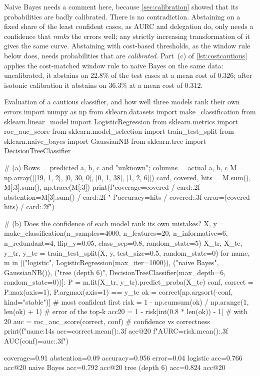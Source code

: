 Naive Bayes needs a comment here, because \cref{sec:calibration} showed that its probabilities are badly
calibrated. There is no contradiction. Abstaining on a fixed share of the least confident cases, as AURC and
delegation do, only needs a confidence that \emph{ranks} the errors well; any strictly increasing transformation of
it gives the same curve. Abstaining with cost-based thresholds, as the window rule below does, needs
probabilities that are \emph{calibrated}. Part~(c) of \cref{lst:costcautious} applies the cost-matched window rule
to naive Bayes on the same data: uncalibrated, it abstains on 22.8\% of the test cases at a mean cost of 0.326;
after isotonic calibration it abstains on 36.3\% at a mean cost of 0.312.

\begin{pylisting}[label={lst:cautious}]{Evaluation of a cautious classifier, and how well three models rank their own errors}
import numpy as np
from sklearn.datasets import make_classification
from sklearn.linear_model import LogisticRegression
from sklearn.metrics import roc_auc_score
from sklearn.model_selection import train_test_split
from sklearn.naive_bayes import GaussianNB
from sklearn.tree import DecisionTreeClassifier

# (a) Rows = predicted a, b, c and "unknown"; columns = actual a, b, c
M = np.array([[19, 1, 2], [0, 30, 0], [0, 1, 38], [1, 2, 6]])
card, covered, hits = M.sum(), M[:3].sum(), np.trace(M[:3])
print(f"coverage={covered / card:.2f}  abstention={M[3].sum() / card:.2f}  "
      f"accuracy={hits / covered:.3f}  error={(covered - hits) / card:.2f}")

# (b) Does the confidence of each model rank its own mistakes?
X, y = make_classification(n_samples=4000, n_features=20, n_informative=6, n_redundant=4,
                           flip_y=0.05, class_sep=0.8, random_state=5)
X_tr, X_te, y_tr, y_te = train_test_split(X, y, test_size=0.5, random_state=0)
for name, m in [("logistic", LogisticRegression(max_iter=1000)),
                ("naive Bayes", GaussianNB()),
                ("tree (depth 6)", DecisionTreeClassifier(max_depth=6, random_state=0))]:
    P = m.fit(X_tr, y_tr).predict_proba(X_te)
    conf, correct = P.max(axis=1), P.argmax(axis=1) == y_te
    ok = correct[np.argsort(-conf, kind="stable")]            # most confident first
    risk = 1 - np.cumsum(ok) / np.arange(1, len(ok) + 1)      # error of the top-k
    acc20 = 1 - risk[int(0.8 * len(ok)) - 1]                  # with 20%
    auc = roc_auc_score(correct, conf)                        # confidence vs correctness
    print(f"{name:14s} acc={correct.mean():.3f}  acc@20%
          f"AURC={risk.mean():.3f}  AUC(conf)={auc:.3f}")
\end{pylisting}
\begin{pyoutput}
coverage=0.91  abstention=0.09  accuracy=0.956  error=0.04
logistic       acc=0.766  acc@20%
naive Bayes    acc=0.792  acc@20%
tree (depth 6) acc=0.824  acc@20%
\end{pyoutput}

